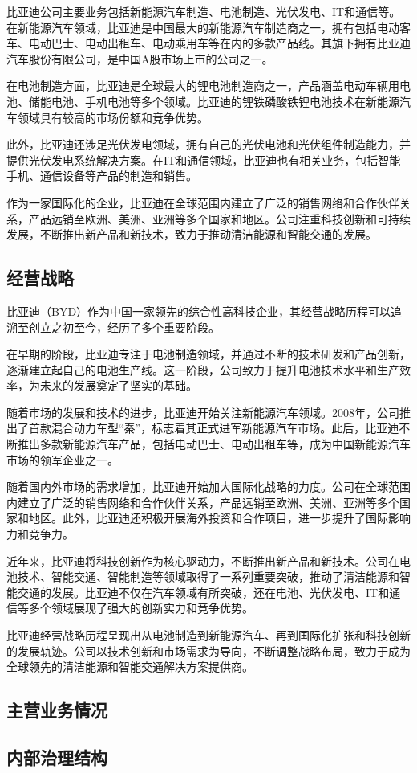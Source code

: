 比亚迪公司主要业务包括新能源汽车制造、电池制造、光伏发电、IT和通信等。在新能源汽车领域，比亚迪是中国最大的新能源汽车制造商之一，拥有包括电动客车、电动巴士、电动出租车、电动乘用车等在内的多款产品线。其旗下拥有比亚迪汽车股份有限公司，是中国A股市场上市的公司之一。

在电池制造方面，比亚迪是全球最大的锂电池制造商之一，产品涵盖电动车辆用电池、储能电池、手机电池等多个领域。比亚迪的锂铁磷酸铁锂电池技术在新能源汽车领域具有较高的市场份额和竞争优势。

此外，比亚迪还涉足光伏发电领域，拥有自己的光伏电池和光伏组件制造能力，并提供光伏发电系统解决方案。在IT和通信领域，比亚迪也有相关业务，包括智能手机、通信设备等产品的制造和销售。

作为一家国际化的企业，比亚迪在全球范围内建立了广泛的销售网络和合作伙伴关系，产品远销至欧洲、美洲、亚洲等多个国家和地区。公司注重科技创新和可持续发展，不断推出新产品和新技术，致力于推动清洁能源和智能交通的发展。
\subsection{经营战略}
比亚迪（BYD）作为中国一家领先的综合性高科技企业，其经营战略历程可以追溯至创立之初至今，经历了多个重要阶段。

在早期的阶段，比亚迪专注于电池制造领域，并通过不断的技术研发和产品创新，逐渐建立起自己的电池生产线。这一阶段，公司致力于提升电池技术水平和生产效率，为未来的发展奠定了坚实的基础。

随着市场的发展和技术的进步，比亚迪开始关注新能源汽车领域。2008年，公司推出了首款混合动力车型“秦”，标志着其正式进军新能源汽车市场。此后，比亚迪不断推出多款新能源汽车产品，包括电动巴士、电动出租车等，成为中国新能源汽车市场的领军企业之一。

随着国内外市场的需求增加，比亚迪开始加大国际化战略的力度。公司在全球范围内建立了广泛的销售网络和合作伙伴关系，产品远销至欧洲、美洲、亚洲等多个国家和地区。此外，比亚迪还积极开展海外投资和合作项目，进一步提升了国际影响力和竞争力。

近年来，比亚迪将科技创新作为核心驱动力，不断推出新产品和新技术。公司在电池技术、智能交通、智能制造等领域取得了一系列重要突破，推动了清洁能源和智能交通的发展。比亚迪不仅在汽车领域有所突破，还在电池、光伏发电、IT和通信等多个领域展现了强大的创新实力和竞争优势。

比亚迪经营战略历程呈现出从电池制造到新能源汽车、再到国际化扩张和科技创新的发展轨迹。公司以技术创新和市场需求为导向，不断调整战略布局，致力于成为全球领先的清洁能源和智能交通解决方案提供商。
\subsection{主营业务情况}

\subsection{内部治理结构}


